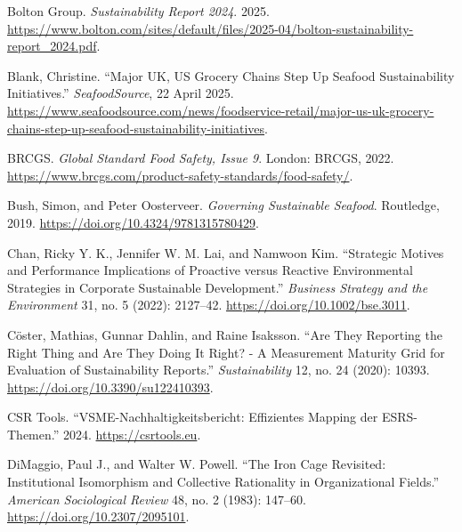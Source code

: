Bolton Group. \emph{Sustainability Report 2024}. 2025. \url{https://www.bolton.com/sites/default/files/2025-04/bolton-sustainability-report\_2024.pdf}. %

Blank, Christine. ``Major UK, US Grocery Chains Step Up Seafood Sustainability Initiatives.'' \emph{SeafoodSource}, 22 April 2025. \url{https://www.seafoodsource.com/news/foodservice-retail/major-us-uk-grocery-chains-step-up-seafood-sustainability-initiatives}. %

BRCGS. \emph{Global Standard Food Safety, Issue 9}. London: BRCGS, 2022. \url{https://www.brcgs.com/product-safety-standards/food-safety/}. %

Bush, Simon, and Peter Oosterveer. \emph{Governing Sustainable Seafood}. Routledge, 2019. \url{https://doi.org/10.4324/9781315780429}.

Chan, Ricky Y. K., Jennifer W. M. Lai, and Namwoon Kim. ``Strategic Motives and Performance Implications of Proactive versus Reactive Environmental Strategies in Corporate Sustainable Development.'' \emph{Business Strategy and the Environment} 31, no. 5 (2022): 2127--42. \url{https://doi.org/10.1002/bse.3011}.

Cöster, Mathias, Gunnar Dahlin, and Raine Isaksson. ``Are They Reporting the Right Thing and Are They Doing It Right? - A Measurement Maturity Grid for Evaluation of Sustainability Reports.'' \emph{Sustainability} 12, no. 24 (2020): 10393. \url{https://doi.org/10.3390/su122410393}.

CSR Tools. ``VSME-Nachhaltigkeitsbericht: Effizientes Mapping der ESRS-Themen.'' 2024. \url{https://csrtools.eu}. %

DiMaggio, Paul J., and Walter W. Powell. ``The Iron Cage Revisited: Institutional Isomorphism and Collective Rationality in Organizational Fields.'' \emph{American Sociological Review} 48, no. 2 (1983): 147--60. \url{https://doi.org/10.2307/2095101}.

